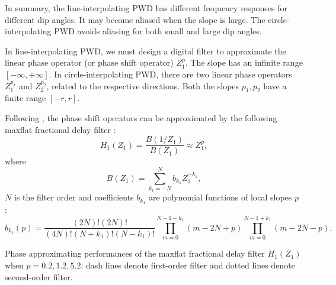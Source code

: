 In summary, the line-interpolating PWD 
has different frequency responses for different dip angles.
It may become aliased when the slope is large.
The circle-interpolating PWD avoids aliasing
for both small and large dip angles.





In line-interpolating PWD,
we must design a digital filter to approximate 
the linear phase operator (or phase shift operator) $Z_1^p$.
The slope has an infinite range $[-\infty,+\infty]$.
In circle-interpolating PWD,
there are two linear phase operators $Z_1^{p_1}$ and $Z_2^{p_2}$,
related to the respective directions.
Both the slopes $p_1, p_2$ have a finite range $[-r,r]$.

Following \cite{fomel:1946},
the phase shift operators can be approximated by
the following maxflat fractional delay filter \cite[]{thiran1971recursive}:
\begin{equation}\label{eq:fd1d}
H_1(Z_1)=\frac{B(1/Z_1)}{B(Z_1)}\approx Z_1^p,
\end{equation}
where
\begin{equation}
B(Z_1)=\sum_{{k_1}=-N}^N b_{{k_1}}Z_1^{-{k_1}},
\end{equation}
$N$ is the filter order
and coefficients $b_{{k_1}}$ are polynomial functions of local slopes $p$
\cite[]{chen:2012a}:
\begin{equation}\label{eq:coef}
b_{k_1}(p)=
\frac{(2N)!(2N)!}{(4N)!(N+k_1)!(N-k_1)!}
\prod_{m=0}^{N-1-k_1}(m-2N+p)
\prod_{m=0}^{N-1+k_1}(m-2N-p).
\end{equation}


{Phase approximating performances of the maxflat fractional delay 
filter $H_1(Z_1)$ when $p=0.2,1.2,5.2$:
dash lines denote first-order filter and dotted lines denote second-order filter.}


